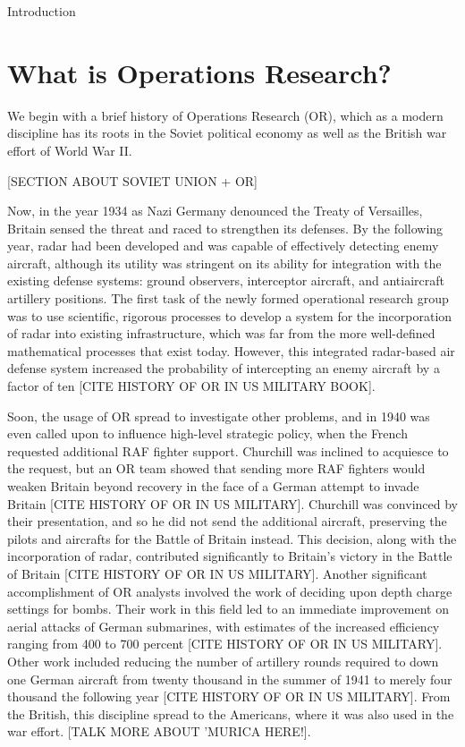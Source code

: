 \documentclass[12pt]{pom_thesis}
\theoremstyle{definition}
\begin{document}
\begin{chapter}{Introduction}
\label{Intro}
\section{What is Operations Research?}

	We begin with a brief history of Operations Research (OR), which as a modern discipline has its roots in the Soviet political economy as well as the British war effort of World War II. 
	
	[SECTION ABOUT SOVIET UNION + OR]
	
	Now, in the year 1934 as Nazi Germany denounced the Treaty of Versailles, Britain sensed the threat and raced to strengthen its defenses. By the following year, radar had been developed and was capable of effectively detecting enemy aircraft, although its utility was stringent on its ability for integration with the existing defense systems: ground observers, interceptor aircraft, and antiaircraft artillery positions. The first task of the newly formed operational research group was to use scientific, rigorous processes to develop a system for the incorporation of radar into existing infrastructure, which was far from the more well-defined mathematical processes that exist today. However, this integrated radar-based air defense system increased the probability of intercepting an enemy aircraft by a factor of ten [CITE HISTORY OF OR IN US MILITARY BOOK]. 
	
	 Soon, the usage of OR spread to investigate other problems, and in 1940 was even called upon to influence high-level strategic policy, when the French requested additional RAF fighter support. Churchill was inclined to acquiesce to the request, but an OR team showed that sending more RAF fighters would weaken Britain beyond recovery in the face of a German attempt to invade Britain [CITE HISTORY OF OR IN US MILITARY]. Churchill was convinced by their presentation, and so he did not send the additional aircraft, preserving the pilots and aircrafts for the Battle of Britain instead. This decision, along with the incorporation of radar, contributed significantly to Britain's victory in the Battle of Britain [CITE HISTORY OF OR IN US MILITARY]. 
	Another significant accomplishment of OR analysts involved the work of deciding upon depth charge settings for bombs. Their work in this field led to an immediate improvement on aerial attacks of German submarines, with estimates of the increased efficiency ranging from 400 to 700 percent [CITE HISTORY OF OR IN US MILITARY]. Other work included reducing the number of artillery rounds required to down one German aircraft  from twenty thousand in the summer of 1941 to merely four thousand the following year [CITE HISTORY OF OR IN US MILITARY].
	From the British, this discipline spread to the Americans, where it was also used in the war effort. [TALK MORE ABOUT 'MURICA HERE!].
	

\end{chapter}
\end{document}
